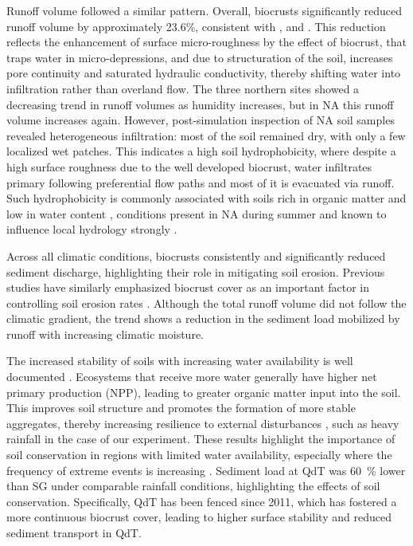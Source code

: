 Runoff volume followed a similar pattern. Overall, biocrusts significantly reduced runoff volume by approximately 23.6\%, consistent with \citet{Bu2015}, \citet{Gall2022b} and \citet{Xiao2022}. This reduction reflects the enhancement of surface micro-roughness by the effect of biocrust, that traps water in micro-depressions, and due to structuration of the soil, increases pore continuity and saturated hydraulic conductivity, thereby shifting water into infiltration rather than overland flow. The three northern sites showed a decreasing trend in runoff volumes as humidity increases, but in NA this runoff volume increases again. However, post-simulation inspection of NA soil samples revealed heterogeneous infiltration: most of the soil remained dry, with only a few localized wet patches. This indicates a high soil hydrophobicity, where despite a high surface roughness due to the well developed biocrust, water infiltrates primary following preferential flow paths and most of it is evacuated via runoff. Such hydrophobicity is commonly associated with soils rich in organic matter and low in water content \citep{JimenezMorillo2022,Xing2023}, conditions present in NA during summer and known to influence local hydrology strongly \citep{Hassan2022}.

Across all climatic conditions, biocrusts consistently and significantly reduced sediment discharge, highlighting their role in mitigating soil erosion. Previous studies have similarly emphasized biocrust cover as an important factor in controlling soil erosion rates \citep{Chamizo2017,Gall2022b,Seitz2017,Silva2019}. Although the total runoff volume did not follow the climatic gradient, the trend shows a reduction in the sediment load mobilized by runoff with increasing climatic moisture.

The increased stability of soils with increasing water availability is well documented \citep{Lal2020,RiverasMunoz2022}. Ecosystems that receive more water generally have higher net primary production (NPP), leading to greater organic matter input into the soil. This improves soil structure and promotes the formation of more stable aggregates, thereby increasing resilience to external disturbances \citep{Lal2020}, such as heavy rainfall in the case of our experiment. These results highlight the importance of soil conservation in regions with limited water availability, especially where the frequency of extreme events is increasing \citep{MeseguerRuiz2020}. Sediment load at QdT was \SI{60}{\percent} lower than SG under comparable rainfall conditions, highlighting the effects of soil conservation. Specifically, QdT has been fenced since \num{2011}, which has fostered a more continuous biocrust cover, leading to higher surface stability and reduced sediment transport in QdT.

